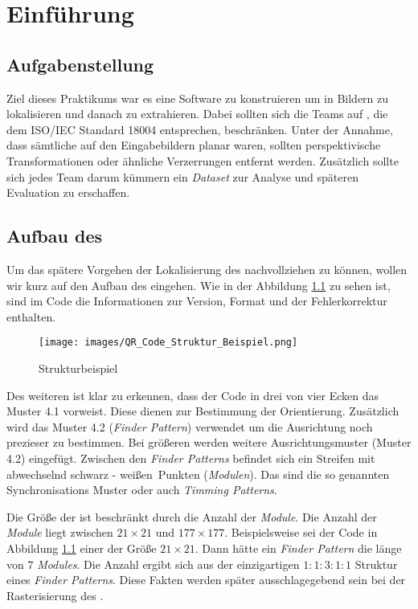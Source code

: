 \chapter{Einführung}
\section{Aufgabenstellung}
Ziel dieses Praktikums war es eine Software zu konstruieren um \QRCodes in Bildern zu lokalisieren und danach zu extrahieren.
Dabei sollten sich die Teams auf \QRCodes, die dem ISO/IEC Standard 18004 entsprechen, beschränken.
Unter der Annahme, dass sämtliche \QRCodes auf den Eingabebildern planar waren, sollten perspektivische Transformationen oder ähnliche Verzerrungen entfernt werden.
Zusätzlich sollte sich jedes Team darum kümmern ein \emph{Dataset} zur Analyse und späteren Evaluation zu erschaffen.
 
\section{Aufbau des \QRCodes}
Um das spätere Vorgehen der Lokalisierung des \QRCodes nachvollziehen zu können, wollen wir kurz auf den Aufbau des \QRCodes eingehen.
Wie in der Abbildung \ref{fig:struktur-qrcode} zu sehen ist, sind im Code die Informationen zur Version, Format und der Fehlerkorrektur enthalten. 

\begin{figure}[h]
\centering
\texttt{[image: images/QR\_Code\_Struktur\_Beispiel.png]}
\label{fig:struktur-qrcode}\caption{\QRCode Strukturbeispiel}
\end{figure}

Des weiteren ist klar zu erkennen, dass der Code in drei von vier Ecken das Muster 4.1 vorweist. Diese dienen zur Bestimmung der Orientierung. Zusätzlich wird das Muster 4.2 (\emph{Finder Pattern}) verwendet um die Ausrichtung noch prezieser zu bestimmen. Bei größeren \QRCodes werden weitere Ausrichtungsmuster (Muster 4.2) eingefügt. Zwischen den \emph{Finder Patterns} befindet sich ein Streifen mit abwechselnd \glqq schwarz - weißen\grqq\  Punkten (\emph{Modulen}). Das sind die so genannten Synchronisations Muster oder auch \emph{Timming Patterns}.

Die Größe der \QRCodes ist beschränkt durch die Anzahl der \emph{Module}. Die Anzahl der \emph{Module} liegt zwischen $21 \times 21$ und $177 \times 177$. Beispielsweise sei der Code in Abbildung \ref{fig:struktur-qrcode} einer der Größe $21 \times 21$. Dann hätte ein \emph{Finder Pattern} die länge von $7$ \emph{Modules}. Die Anzahl ergibt sich aus der einzigartigen $1:1:3:1:1$ Struktur eines \emph{Finder Patterns}. Diese Fakten werden später ausschlagegebend sein bei der Rasterisierung des \QRCodes.

